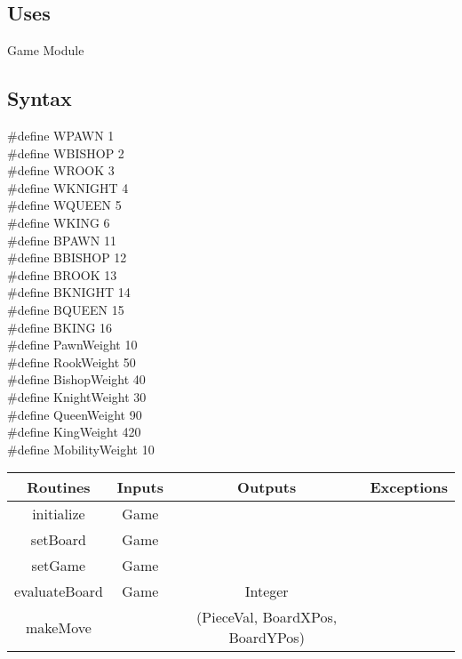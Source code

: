 \documentclass{article}
\begin{document}
    \subsection*{Uses}
        Game Module
    
    \subsection*{Syntax}
        \#define WPAWN 1\\
        \#define WBISHOP 2\\
        \#define WROOK 3\\
        \#define WKNIGHT 4\\
        \#define WQUEEN 5\\
        \#define WKING 6\\
        \#define BPAWN 11\\
        \#define BBISHOP 12\\
        \#define BROOK 13\\
        \#define BKNIGHT 14\\
        \#define BQUEEN 15\\
        \#define BKING 16\\
        \#define PawnWeight 10\\
        \#define RookWeight 50\\
        \#define BishopWeight 40\\
        \#define KnightWeight 30\\
        \#define QueenWeight 90\\
        \#define KingWeight 420\\
        \#define MobilityWeight 10\\
        \begin{center}
            \begin{tabular}{|c|c|c|c|} 
                \hline
                Routines & Inputs & Outputs & Exceptions \\
                \hline
                initialize & Game & &\\
                \hline
                setBoard & Game & &  \\ 
                \hline
                setGame & Game &  & \\
                \hline
                evaluateBoard & Game & Integer & \\
                \hline
                makeMove & & (PieceVal, BoardXPos, BoardYPos)& \\
                \hline
            \end{tabular}
        \end{center}
    
\end{document}
